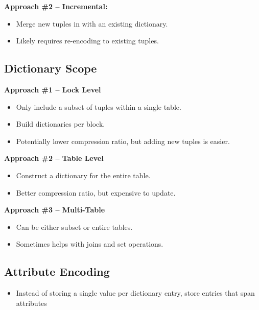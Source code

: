 \documentclass[11pt]{article}
\begin{document}
\textbf{Approach \#2 -- Incremental:}
\begin{itemize}
    \item
    Merge new tuples in with an existing dictionary.
    
    \item
    Likely requires re-encoding to existing tuples.
\end{itemize}

\subsection*{Dictionary Scope}

\textbf{Approach \#1 -- Lock Level}
\begin{itemize}
    \item
    Only include a subset of tuples within a single table.
    
    \item
    Build dictionaries per block.
    
    \item
    Potentially lower compression ratio, but adding new tuples is easier.
\end{itemize}

\textbf{Approach \#2 -- Table Level}
\begin{itemize}
    \item
    Construct a dictionary for the entire table.
    
    \item
    Better compression ratio, but expensive to update.
\end{itemize}

\textbf{Approach \#3 -- Multi-Table}
\begin{itemize}
    \item
    Can be either subset or entire tables.
    
    \item
    Sometimes helps with joins and set operations.
\end{itemize}

    \subsection*{Attribute Encoding}
    \begin{itemize}
        \item Instead of storing a single value per dictionary entry, store entries that span attributes
    \end{itemize}
\end{document}
